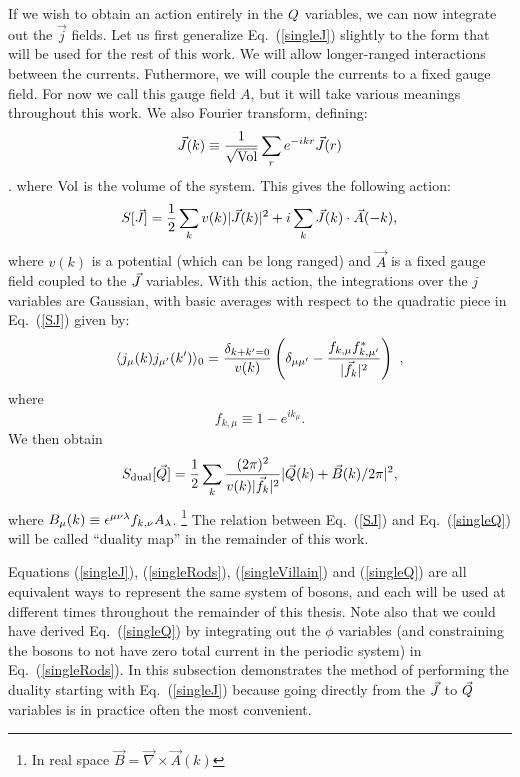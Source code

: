 If we wish to obtain an action entirely in the $Q$ variables, we can now integrate out the $\vec{j}$ fields. Let us first generalize Eq.~(\ref{singleJ}) slightly to the form that will be used for the rest of this work. We will allow longer-ranged interactions between the currents. Futhermore, we will couple the currents to a fixed gauge field. For now we call this gauge field $A$, but it will take various meanings throughout this work. We also Fourier transform, defining:
\begin{equation}
\vec{J}(k)\equiv \frac{1}{\sqrt{\rm Vol}} \sum_r e^{-ikr} \vec{J}(r)
\label{fourier_def}
\end{equation}. 
where ${\rm Vol}$ is the volume of the system. This gives the following action:
\begin{eqnarray}
S[\vec{J}]=\frac{1}{2}\sum_{k} v(k) |\vec{J}(k)|^2 + i\sum_k  \vec{J}(k)\cdot \vec{A}(-k),
\label{SJ}
\end{eqnarray}
where $v(k)$ is a potential (which can be long ranged) and $\vec{A}$ is a fixed gauge field coupled to the $\vec{J}$ variables. 
With this action, the integrations over the $j$ variables are Gaussian, with basic averages with respect to the quadratic piece in Eq.~(\ref{SJ}) given by:
\begin{equation}
\langle j_\mu(k) j_{\mu'}(k') \rangle_0 = \frac{\delta_{k+k'=0}}{v(k)} \left(\delta_{\mu \mu'} - \frac{f_{k,\mu} f_{k,\mu'}^*}{|\vec{f}_k|^2} \right) ~,
\end{equation}
 where 
 \begin{equation}
 f_{k,\mu} \equiv 1 - e^{i k_\mu}.
 \end{equation}
  We then obtain
\begin{equation}
S_{\rm dual}[\vec{Q}] = \frac{1}{2} \sum_k \frac{(2\pi)^2}{v(k) |\vec{f}_k|^2} |\vec{Q}(k) + \vec{B}(k)/2\pi|^2,
\label{singleQ}
\end{equation}
where $B_\mu(k) \equiv \epsilon^{\mu\nu\lambda} f_{k,\nu} A_\lambda$.
\footnote{In real space $\vec{B}=\vec{\nabla}\times \vec{A}(k)$}
  The relation between Eq.~(\ref{SJ}) and Eq.~(\ref{singleQ}) will be called ``duality map'' in the remainder of this work. 

Equations (\ref{singleJ}), (\ref{singleRods}), (\ref{singleVillain}) and (\ref{singleQ}) are all equivalent ways to represent the same system of bosons, and each will be used at different times throughout the remainder of this thesis. Note also that we could have derived Eq.~(\ref{singleQ}) by integrating out the $\phi$ variables (and constraining the bosons to not have zero total current in the periodic system) in Eq.~(\ref{singleRods}). 
In this subsection demonstrates the method of performing the duality starting with Eq.~(\ref{singleJ}) because going directly from the $\vec{J}$ to $\vec{Q}$ variables is in practice often the most convenient.

